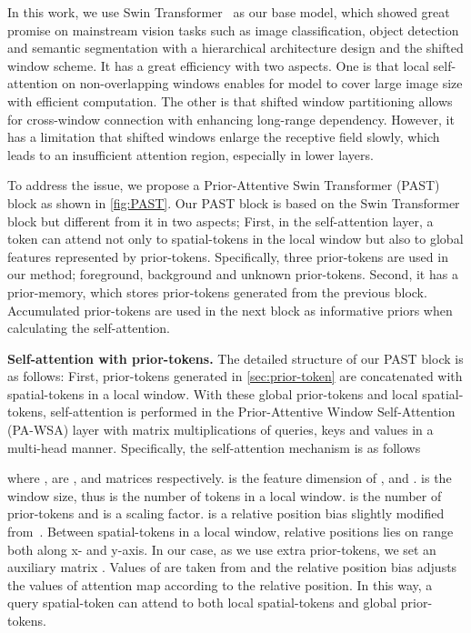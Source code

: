 \documentclass[10pt,twocolumn,letterpaper]{article}
\begin{document}
In this work, we use Swin Transformer~\cite{liu2021swin} as our base model, which showed great promise on mainstream vision tasks such as image classification, object detection and semantic segmentation with a hierarchical architecture design and the shifted window scheme. It has a great efficiency with two aspects. One is that local self-attention on non-overlapping windows enables for model to cover large image size with efficient computation. The other is that shifted window partitioning allows for cross-window connection with enhancing long-range dependency.
However, it has a limitation that shifted windows enlarge the receptive field slowly, which leads to an insufficient attention region, especially in lower layers.

To address the issue, we propose a Prior-Attentive Swin Transformer (PAST) block as shown in \cref{fig:PAST}. Our PAST block is based on the Swin Transformer block but different from it in two aspects; 
First, in the self-attention layer, a token can attend not only to spatial-tokens in the local window but also to global features represented by prior-tokens. Specifically, three prior-tokens are used in our method; foreground, background and unknown prior-tokens. Second, it has a prior-memory, which stores prior-tokens generated from the previous block. Accumulated prior-tokens are used in the next block as informative priors when calculating the self-attention.

\textbf{Self-attention with prior-tokens.}
The detailed structure of our PAST block is as follows: First, prior-tokens generated in \cref{sec:prior-token} are concatenated with spatial-tokens in a local window. With these global prior-tokens and local spatial-tokens, self-attention is performed in the Prior-Attentive Window Self-Attention (PA-WSA) layer with matrix multiplications of queries, keys and values in a multi-head manner.
Specifically, the self-attention mechanism is as follows

where ,  are ,  and  matrices respectively.
 is the feature dimension of ,  and . 
 is the window size, thus  is the number of tokens in a local window.  is the number of prior-tokens and  is a scaling factor. 
 is a relative position bias slightly modified from~\cite{liu2021swin}. 
Between spatial-tokens in a local window, relative positions lies on range  both along x- and y-axis.
In our case, as we use extra prior-tokens, we set an auxiliary matrix . Values of  are taken from  and the relative position bias  adjusts the values of attention map according to the relative position.
In this way, a query spatial-token can attend to both local spatial-tokens and global prior-tokens.
\end{document}
